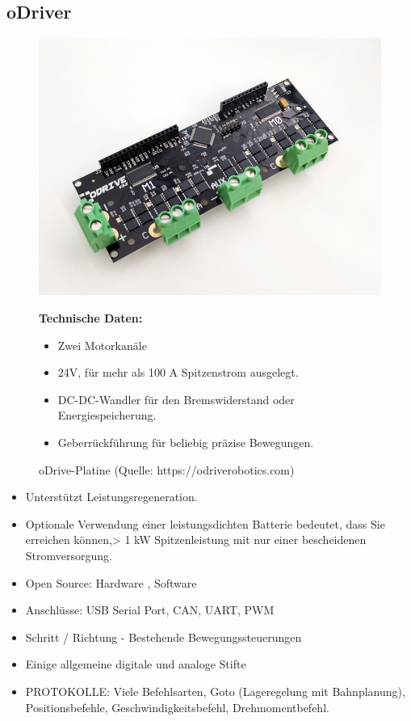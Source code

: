 \subsection{oDriver}
\begin{figure}[htb]
	\centering
	\begin{minipage}{0.38\linewidth}
		\centering
		\includegraphics[scale=0.2]{images/odrive.jpeg}
		\caption{oDrive-Platine  \newline (Quelle: https://odriverobotics.com)}
		\label{odrive}
	\end{minipage}
 \begin{minipage}[h]{0.6\textwidth}
	\textbf{Technische Daten:} 
	\begin{itemize} 
		\item Zwei Motorkanäle
		\item 24V, für mehr als 100 A Spitzenstrom ausgelegt.
		\item DC-DC-Wandler für den Bremswiderstand oder Energiespeicherung.
		\item Geberrückführung für beliebig präzise Bewegungen.
	\end{itemize}
\end{minipage}
\end{figure}

\begin{itemize} 
\item Unterstützt Leistungsregeneration.
\item Optionale Verwendung einer leistungsdichten Batterie bedeutet, dass Sie erreichen können,> 1 kW Spitzenleistung mit nur einer bescheidenen Stromversorgung.
\item Open Source: Hardware , Software
\item Anschlüsse: USB Serial Port, CAN, UART, PWM
\item Schritt / Richtung - Bestehende Bewegungssteuerungen
\item Einige allgemeine digitale und analoge Stifte
\item PROTOKOLLE: Viele  Befehlsarten, 
Goto (Lageregelung mit Bahnplanung), 
Positionsbefehle, 
Geschwindigkeitsbefehl, 
Drehmomentbefehl.
\end{itemize}

